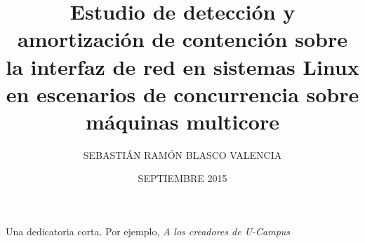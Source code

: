 \documentclass[upright, contnum]{umemoria}
\author{SEBASTIÁN RAMÓN BLASCO VALENCIA}
\title{Estudio de detección y amortización de contención sobre la interfaz de red en sistemas Linux en escenarios de concurrencia sobre máquinas multicore}
\date{SEPTIEMBRE 2015}
\begin{document}
\frontmatter
\maketitle

\begin{abstract}
{\lipsum[1-4]}
\end{abstract}

\begin{dedicatoria} %
Una dedicatoria corta. Por ejemplo, \emph{A los creadores de U-Campus}
\end{dedicatoria}

\begin{thanks} %
\lipsum[1-2]
\end{thanks}
\cleardoublepage

\tableofcontents
\listoftables %
\listoffigures %

\mainmatter

%

%
%

%



%

%







\end{document}
